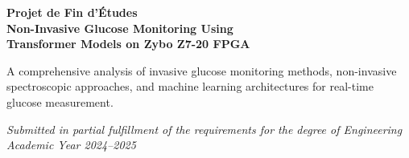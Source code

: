 \documentclass[12pt,a4paper]{report}
\begin{document}
\begin{titlepage}
\centering
\vspace*{2cm}
{\LARGE\bfseries Projet de Fin d'\'Etudes\\[0.5em]
Non-Invasive Glucose Monitoring Using\\
Transformer Models on Zybo Z7-20 FPGA\par}
\vspace{2cm}
{\large A comprehensive analysis of invasive glucose monitoring methods,
non-invasive spectroscopic approaches, and machine learning architectures
for real-time glucose measurement.\par}
\vspace{3cm}
{\large\itshape Submitted in partial fulfillment of the requirements
for the degree of Engineering\\[0.5em]
Academic Year 2024--2025\par}
\vfill
\end{titlepage}

\tableofcontents
\newpage



% 

% 
\end{document}
